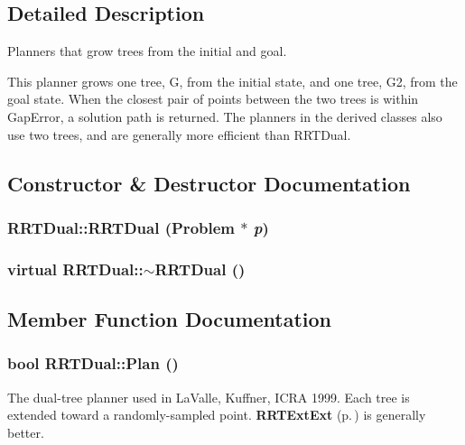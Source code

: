 \subsection{Detailed Description}
Planners that grow trees from the initial and goal.

This planner grows one tree, G, from the initial state,  and one tree, G2, from the goal state. When the closest pair of points between the two trees is within Gap\-Error, a solution path is returned. The planners in the derived classes also use two trees, and are generally more efficient than RRTDual. 



\subsection{Constructor \& Destructor Documentation}
\subsubsection{\setlength{\rightskip}{0pt plus 5cm}RRTDual::RRTDual ({\bf Problem} $\ast$ {\em p})}\label{classRRTDual_a0}


\subsubsection{\setlength{\rightskip}{0pt plus 5cm}virtual RRTDual::$\sim$RRTDual ()\hspace{0.3cm}{\tt  [inline, virtual]}}\label{classRRTDual_a1}




\subsection{Member Function Documentation}
\subsubsection{\setlength{\rightskip}{0pt plus 5cm}bool RRTDual::Plan ()\hspace{0.3cm}{\tt  [virtual]}}\label{classRRTDual_a2}


The dual-tree planner used in La\-Valle, Kuffner, ICRA 1999. Each tree is extended toward a randomly-sampled point. {\bf RRTExt\-Ext} {\rm (p.\,\pageref{classRRTExtExt})} is generally better.



